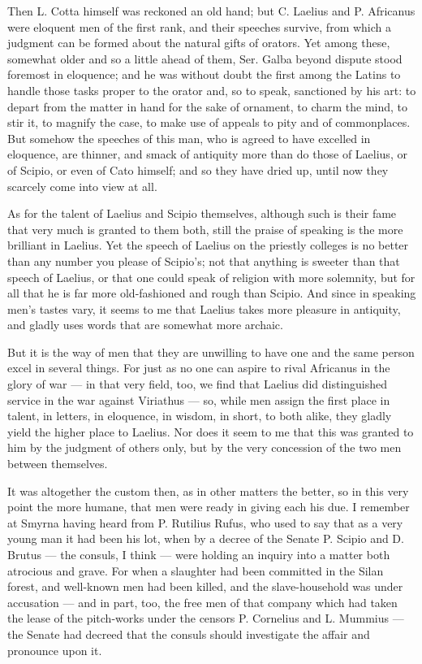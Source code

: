  Then L. Cotta himself was reckoned an old hand; but C. Laelius and P. Africanus were eloquent men of the first rank, and their speeches survive, from which a judgment can be formed about the natural gifts of orators. Yet among these, somewhat older and so a little ahead of them, Ser. Galba beyond dispute stood foremost in eloquence; and he was without doubt the first among the Latins to handle those tasks proper to the orator and, so to speak, sanctioned by his art: to depart from the matter in hand for the sake of ornament, to charm the mind, to stir it, to magnify the case, to make use of appeals to pity and of commonplaces. But somehow the speeches of this man, who is agreed to have excelled in eloquence, are thinner, and smack of antiquity more than do those of Laelius, or of Scipio, or even of Cato himself; and so they have dried up, until now they scarcely come into view at all.

 As for the talent of Laelius and Scipio themselves, although such is their fame that very much is granted to them both, still the praise of speaking is the more brilliant in Laelius. Yet the speech of Laelius on the priestly colleges is no better than any number you please of Scipio's; not that anything is sweeter than that speech of Laelius, or that one could speak of religion with more solemnity, but for all that he is far more old-fashioned and rough than Scipio. And since in speaking men's tastes vary, it seems to me that Laelius takes more pleasure in antiquity, and gladly uses words that are somewhat more archaic.

 But it is the way of men that they are unwilling to have one and the same person excel in several things. For just as no one can aspire to rival Africanus in the glory of war — in that very field, too, we find that Laelius did distinguished service in the war against Viriathus — so, while men assign the first place in talent, in letters, in eloquence, in wisdom, in short, to both alike, they gladly yield the higher place to Laelius. Nor does it seem to me that this was granted to him by the judgment of others only, but by the very concession of the two men between themselves.

 It was altogether the custom then, as in other matters the better, so in this very point the more humane, that men were ready in giving each his due. I remember at Smyrna having heard from P. Rutilius Rufus, who used to say that as a very young man it had been his lot, when by a decree of the Senate P. Scipio and D. Brutus — the consuls, I think — were holding an inquiry into a matter both atrocious and grave. For when a slaughter had been committed in the Silan forest, and well-known men had been killed, and the slave-household was under accusation — and in part, too, the free men of that company which had taken the lease of the pitch-works under the censors P. Cornelius and L. Mummius — the Senate had decreed that the consuls should investigate the affair and pronounce upon it.

